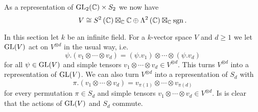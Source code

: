 \begin{example}
  As a representation of $\operatorname{GL}_2(\mathbb{C}) \times S_2$ we now have
  \[
          V
    \cong         S^2\left( \mathbb{C} \right) \boxtimes_{\mathbb{C}} \mathbb{C}
          \oplus  \Lambda^2\left( \mathbb{C} \right) \boxtimes_{\mathbb{C}} \operatorname{sgn}.
  \]
\end{example}


In this section let $k$ be an infinite field.
For a $k$-vector space $V$ and $d \geq 1$ we let $\operatorname{GL}(V)$ act on $V^{\otimes d}$ in the usual way, i.e.\
\[
    \psi.(v_1 \otimes \dotsb \otimes v_d)
  = (\psi.v_1) \otimes \dotsb \otimes (\psi.v_d)
\]
for all $\psi \in \operatorname{GL}(V)$ and simple tensors $v_1 \otimes \dotsb \otimes v_d \in V^{\otimes d}$.
This turns $V^{\otimes d}$ into a representation of $\operatorname{GL}(V)$.
We can also turn $V^{\otimes d}$ into a representation of $S_d$ with
\[
    \pi.(v_1 \otimes \dotsb \otimes v_d)
  = v_{\pi(1)} \otimes \dotsb \otimes v_{\pi(d)}
\]
for every permutation $\pi \in S_d$ and simple tensors $v_1 \otimes \dotsb \otimes v_d \in V^{\otimes d}$. 
Is is clear that the actions of $\operatorname{GL}(V)$ and $S_d$ commute.

